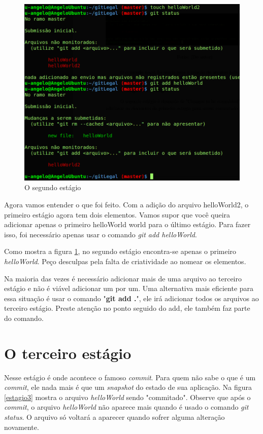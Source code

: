 \documentclass[12pt,openright,oneside,a4paper,english,brazil]{abntex2}
\begin{document}
\begin{figure}[h]
	\caption{\label{estagio2}O segundo estágio}
	\begin{center}
		\includegraphics[width=1\linewidth]{estagio2}
	\end{center}
\end{figure}

Agora vamos entender o que foi feito. Com a adição do arquivo helloWorld2, o primeiro estágio agora tem dois elementos. Vamos supor que você queira adicionar apenas o primeiro helloWorld world para o último estágio. Para fazer isso, foi necessário apenas usar o comando \textit{git add helloWorld}.

Como mostra a figura \ref{estagio2}, no segundo estágio encontra-se apenas o primeiro \textit{helloWorld}. Peço desculpas pela falta de criatividade ao nomear os elementos.

Na maioria das vezes é necessário adicionar mais de uma arquivo ao terceiro estágio e não é viável adicionar um por um. Uma alternativa mais eficiente para essa situação é usar o comando "\textbf{git add .}", ele irá adicionar todos os arquivos ao terceiro estágio. Preste atenção no ponto seguido do add, ele também faz parte do comando.

\section{O terceiro estágio}

Nesse estágio é onde acontece o famoso \textit{commit}. Para quem não sabe o que é um \textit{commit}, ele nada mais é que um \textit{snapshot} do estado de sua aplicação. Na figura \ref{estagio3} mostra o arquivo \textit{helloWorld} sendo "commitado". Observe que após o \textit{commit}, o arquivo \textit{helloWorld} não aparece mais quando é usado o comando \textit{git status}. O arquivo só voltará a aparecer quando sofrer alguma alteração novamente. 
\end{document}
